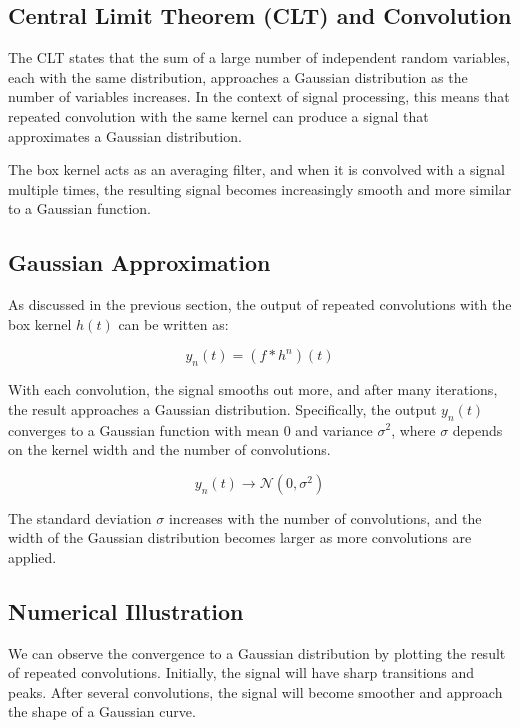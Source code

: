 \documentclass{article}
\begin{document}
\subsection*{Central Limit Theorem (CLT) and Convolution}

The CLT states that the sum of a large number of independent random variables, each with the same distribution, approaches a Gaussian distribution as the number of variables increases. In the context of signal processing, this means that repeated convolution with the same kernel can produce a signal that approximates a Gaussian distribution.

The box kernel acts as an averaging filter, and when it is convolved with a signal multiple times, the resulting signal becomes increasingly smooth and more similar to a Gaussian function.

\subsection*{Gaussian Approximation}

As discussed in the previous section, the output of repeated convolutions with the box kernel \( h(t) \) can be written as:

\[
y_n(t) = (f * h^n)(t)
\]

With each convolution, the signal smooths out more, and after many iterations, the result approaches a Gaussian distribution. Specifically, the output \( y_n(t) \) converges to a Gaussian function with mean \( 0 \) and variance \( \sigma^2 \), where \( \sigma \) depends on the kernel width and the number of convolutions.

\[
y_n(t) \to \mathcal{N}(0, \sigma^2)
\]

The standard deviation \( \sigma \) increases with the number of convolutions, and the width of the Gaussian distribution becomes larger as more convolutions are applied.

\subsection*{Numerical Illustration}

We can observe the convergence to a Gaussian distribution by plotting the result of repeated convolutions. Initially, the signal will have sharp transitions and peaks. After several convolutions, the signal will become smoother and approach the shape of a Gaussian curve.
\end{document}
